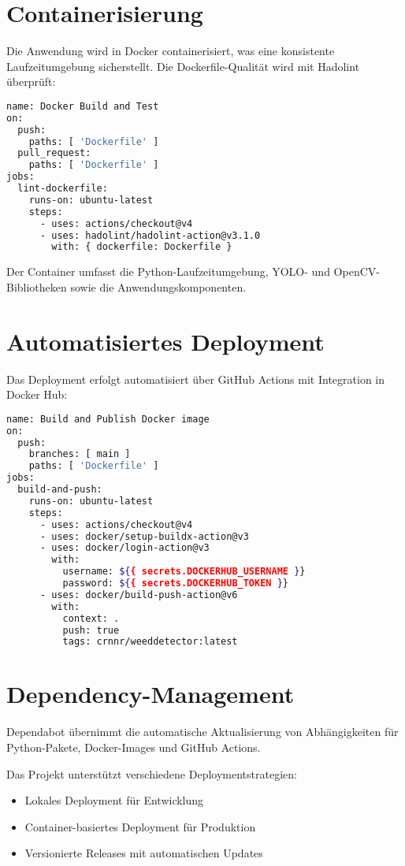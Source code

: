 \documentclass[12pt]{scrreprt}
\begin{document}
\section{Containerisierung}

Die Anwendung wird in Docker containerisiert, was eine konsistente Laufzeitumgebung sicherstellt. Die Dockerfile-Qualität wird mit Hadolint überprüft:

\begin{lstlisting}[language= Bash, caption=Docker Lint]
name: Docker Build and Test
on:
  push:
    paths: [ 'Dockerfile' ]
  pull_request:
    paths: [ 'Dockerfile' ]
jobs:
  lint-dockerfile:
    runs-on: ubuntu-latest
    steps:
      - uses: actions/checkout@v4
      - uses: hadolint/hadolint-action@v3.1.0
        with: { dockerfile: Dockerfile }
\end{lstlisting}

Der Container umfasst die Python-Laufzeitumgebung, YOLO- und OpenCV-Bibliotheken sowie die Anwendungskomponenten.

\section{Automatisiertes Deployment}

Das Deployment erfolgt automatisiert über GitHub Actions mit Integration in Docker Hub:

\begin{lstlisting}[language= Bash, caption=Build and Publish]
name: Build and Publish Docker image
on:
  push:
    branches: [ main ]
    paths: [ 'Dockerfile' ]
jobs:
  build-and-push:
    runs-on: ubuntu-latest
    steps:
      - uses: actions/checkout@v4
      - uses: docker/setup-buildx-action@v3
      - uses: docker/login-action@v3
        with:
          username: ${{ secrets.DOCKERHUB_USERNAME }}
          password: ${{ secrets.DOCKERHUB_TOKEN }}
      - uses: docker/build-push-action@v6
        with:
          context: .
          push: true
          tags: crnnr/weeddetector:latest
\end{lstlisting}

\section{Dependency-Management}

Dependabot übernimmt die automatische Aktualisierung von Abhängigkeiten für Python-Pakete, Docker-Images und GitHub Actions.

Das Projekt unterstützt verschiedene Deploymentstrategien:
\begin{itemize}
    \item Lokales Deployment für Entwicklung
    \item Container-basiertes Deployment für Produktion
    \item Versionierte Releases mit automatischen Updates
\end{itemize}
\end{document}
